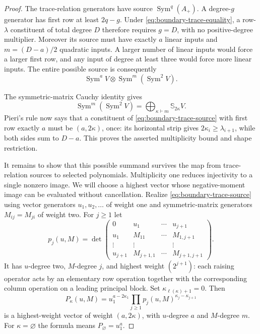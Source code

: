 \begin{proof}
The trace-relation generators have source
$\operatorname{Sym}^{q}(A_+)$.  A degree-$g$ generator has first
row at least $2q-g$.  Under \eqref{eq:boundary-trace-equality}, a
row-$\lambda$ constituent of total degree $D$ therefore requires
$g=D$, with no positive-degree multiplier.  Moreover its source
must have exactly $a$ linear inputs and
$m=(D-a)/2$ quadratic inputs.  A larger number of linear inputs
would force a larger first row, and any input of degree at least
three would force more linear inputs.  The entire possible source
is consequently
\begin{equation}\label{eq:boundary-trace-source}
     \operatorname{Sym}^{a}V\otimes
          \operatorname{Sym}^{m}(\operatorname{Sym}^{2}V).
\end{equation}

The symmetric-matrix Cauchy identity gives
\[
 \operatorname{Sym}^{m}(\operatorname{Sym}^{2}V)
       =\bigoplus_{\kappa\vdash m}\mathbb S_{2\kappa}V.
\]
Pieri's rule now says that a constituent of
\eqref{eq:boundary-trace-source} with first row exactly $a$ must
be $(a,2\kappa)$, once: its horizontal strip gives
$2\kappa_i\ge\lambda_{i+1}$, while both sides sum to $D-a$.
This proves the asserted multiplicity bound and shape restriction.

It remains to show that this possible summand survives the map
from trace-relation sources to selected polynomials.  Multiplicity
one reduces injectivity to a single nonzero image.  We will choose
a highest vector whose negative-moment image can be evaluated
without cancellation.
Realize
\eqref{eq:boundary-trace-source} using vector generators
$u_1,u_2,\ldots$ of weight one and symmetric-matrix generators
$M_{ij}=M_{ji}$ of weight two.  For $j\ge1$ let
\begin{equation}\label{eq:boundary-bordered-minor}
 p_j(u,M)=
 \det\begin{pmatrix}
  0&u_1&\cdots&u_{j+1}\\
  u_1&M_{11}&\cdots&M_{1,j+1}\\
  \vdots&\vdots&&\vdots\\
  u_{j+1}&M_{j+1,1}&\cdots&M_{j+1,j+1}
 \end{pmatrix}.
\end{equation}
It has $u$-degree two, $M$-degree $j$, and highest weight
$(2^{j+1})$: each raising operator acts by an elementary row
operation together with the corresponding column operation on a
leading principal block.  Set $\kappa_{\ell(\kappa)+1}=0$.
Then
\begin{equation}\label{eq:boundary-highest-vector}
 P_\kappa(u,M)=u_1^{a-2\kappa_1}
       \prod_{j\ge1}p_j(u,M)^{\kappa_j-\kappa_{j+1}}
\end{equation}
is a highest-weight vector of weight $(a,2\kappa)$, with
$u$-degree $a$ and $M$-degree $m$.  For $\kappa=\varnothing$
the formula means $P_\varnothing=u_1^a$.


\end{proof}
